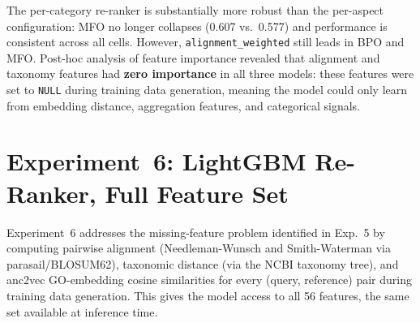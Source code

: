 \begin{table}[htbp]
  \centering
  \caption[Fmax: LightGBM per-category re-ranker]{$F_{\max}$: LightGBM per-category re-ranker with IA weighting (Exp.~5).}
  \label{tab:results-reranker-pc}
\end{table}

The per-category re-ranker is substantially more robust than the per-aspect
configuration: MFO no longer collapses (0.607 vs.\ 0.577) and performance is
consistent across all cells. However, \texttt{alignment\_weighted} still leads
in BPO and MFO. Post-hoc analysis of feature importance revealed that alignment
and taxonomy features had \textbf{zero importance} in all three models: these
features were set to \texttt{NULL} during training data generation, meaning the
model could only learn from embedding distance, aggregation features, and
categorical signals.

\section{Experiment~6: LightGBM Re-Ranker, Full Feature Set}
\label{subsec:exp6-reranker-ff}

Experiment~6 addresses the missing-feature problem identified in Exp.~5 by
computing pairwise alignment (Needleman-Wunsch and Smith-Waterman via
parasail/BLOSUM62), taxonomic distance (via the NCBI taxonomy tree), and
anc2vec GO-embedding cosine similarities
for every (query, reference) pair during training data generation. This gives the
model access to all 56 features, the same set available at inference time.

